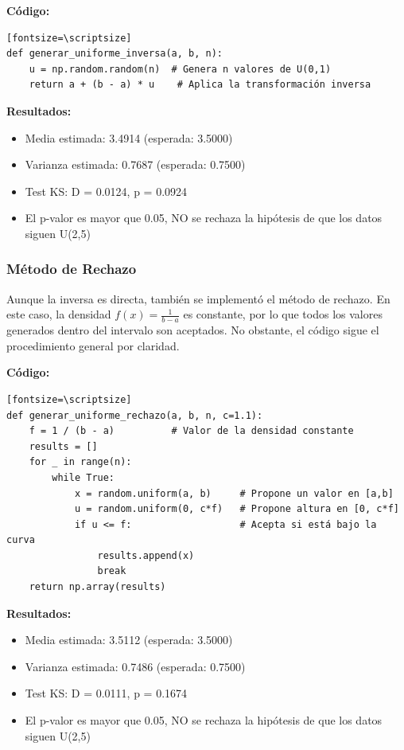\documentclass{article}
\begin{document}
\textbf{Código:}
\begin{verbatim}[fontsize=\scriptsize]
def generar_uniforme_inversa(a, b, n):
    u = np.random.random(n)  # Genera n valores de U(0,1)
    return a + (b - a) * u    # Aplica la transformación inversa
\end{verbatim}

\textbf{Resultados:}
\begin{itemize}
    \item Media estimada: 3.4914 (esperada: 3.5000)
    \item Varianza estimada: 0.7687 (esperada: 0.7500)
    \item Test KS: D = 0.0124, p = 0.0924
    \item El p-valor es mayor que 0.05, NO se rechaza la hipótesis de que los datos siguen U(2,5)
\end{itemize}

\vspace{0.5em}
\subsubsection{Método de Rechazo}
Aunque la inversa es directa, también se implementó el método de rechazo. En este caso, la densidad $f(x) = \frac{1}{b-a}$ es constante, por lo que todos los valores generados dentro del intervalo son aceptados. No obstante, el código sigue el procedimiento general por claridad.

\textbf{Código:}
\begin{verbatim}[fontsize=\scriptsize]
def generar_uniforme_rechazo(a, b, n, c=1.1):
    f = 1 / (b - a)          # Valor de la densidad constante
    results = []
    for _ in range(n):
        while True:
            x = random.uniform(a, b)     # Propone un valor en [a,b]
            u = random.uniform(0, c*f)   # Propone altura en [0, c*f]
            if u <= f:                   # Acepta si está bajo la curva
                results.append(x)
                break
    return np.array(results)
\end{verbatim}

\textbf{Resultados:}
\begin{itemize}
    \item Media estimada: 3.5112 (esperada: 3.5000)
    \item Varianza estimada: 0.7486 (esperada: 0.7500)
    \item Test KS: D = 0.0111, p = 0.1674
    \item El p-valor es mayor que 0.05, NO se rechaza la hipótesis de que los datos siguen U(2,5)
\end{itemize}
\end{document}
